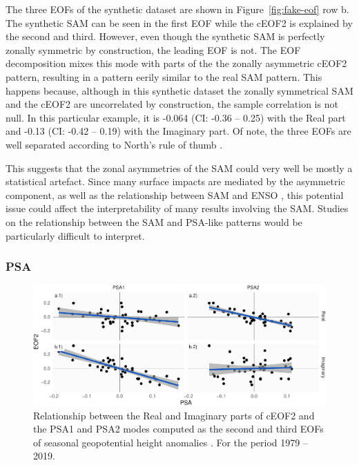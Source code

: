 \documentclass[smallextended]{svjour3}       %
\begin{document}
The three EOFs of the synthetic dataset are shown in Figure~\ref{fig:fake-eof} row b. The synthetic SAM can be seen in the first EOF while the cEOF2 is explained by the second and third. However, even though the synthetic SAM is perfectly zonally symmetric by construction, the leading EOF is not. The EOF decomposition mixes this mode with parts of the the zonally asymmetric cEOF2 pattern, resulting in a pattern eerily similar to the real SAM pattern. This happens because, although in this synthetic dataset the zonally symmetrical SAM and the cEOF2 are uncorrelated by construction, the sample correlation is not null. In this particular example, it is -0.064 (CI: -0.36 -- 0.25) with the Real part and -0.13 (CI: -0.42 -- 0.19) with the Imaginary part. Of note, the three EOFs are well separated according to North's rule of thumb \citep{north1982}.

This suggests that the zonal asymmetries of the SAM could very well be mostly a statistical artefact. Since many surface impacts are mediated by the asymmetric component, as well as the relationship between SAM and ENSO \citep{campitelli2021}, this potential issue could affect the interpretability of many results involving the SAM. Studies on the relationship between the SAM and PSA-like patterns would be particularly difficult to interpret.

\hypertarget{psa}{%
\subsubsection{PSA}\label{psa}}



\begin{figure}
\includegraphics{../figures/psa-eof2-1} \caption{Relationship between the Real and Imaginary parts of cEOF2 and the PSA1 and PSA2 modes computed as the second and third EOFs of seasonal geopotential height anomalies \citep{mo2001}. For the period 1979 -- 2019.}\label{fig:psa-eof2}
\end{figure}
\end{document}
